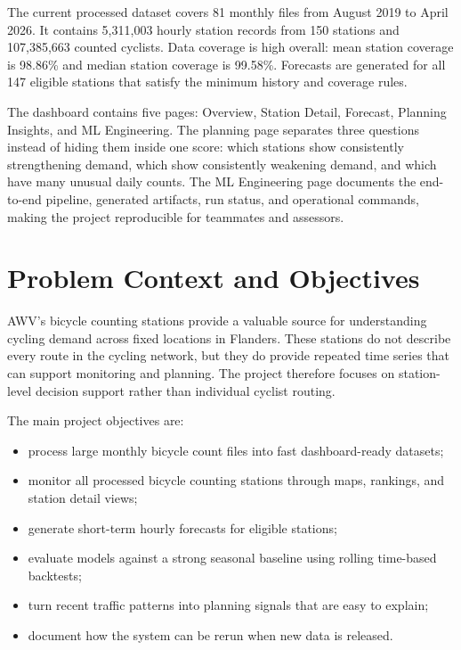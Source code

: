 \documentclass[11pt]{article}
\begin{document}
The current processed dataset covers 81 monthly files from August 2019 to April 2026. It contains 5,311,003 hourly station records from 150 stations and 107,385,663 counted cyclists. Data coverage is high overall: mean station coverage is 98.86\% and median station coverage is 99.58\%. Forecasts are generated for all 147 eligible stations that satisfy the minimum history and coverage rules.

The dashboard contains five pages: Overview, Station Detail, Forecast, Planning Insights, and ML Engineering. The planning page separates three questions instead of hiding them inside one score: which stations show consistently strengthening demand, which show consistently weakening demand, and which have many unusual daily counts. The ML Engineering page documents the end-to-end pipeline, generated artifacts, run status, and operational commands, making the project reproducible for teammates and assessors.

\section{Problem Context and Objectives}

AWV's bicycle counting stations provide a valuable source for understanding cycling demand across fixed locations in Flanders. These stations do not describe every route in the cycling network, but they do provide repeated time series that can support monitoring and planning. The project therefore focuses on station-level decision support rather than individual cyclist routing.

The main project objectives are:

\begin{itemize}
    \item process large monthly bicycle count files into fast dashboard-ready datasets;
    \item monitor all processed bicycle counting stations through maps, rankings, and station detail views;
    \item generate short-term hourly forecasts for eligible stations;
    \item evaluate models against a strong seasonal baseline using rolling time-based backtests;
    \item turn recent traffic patterns into planning signals that are easy to explain;
    \item document how the system can be rerun when new data is released.
\end{itemize}
\end{document}
